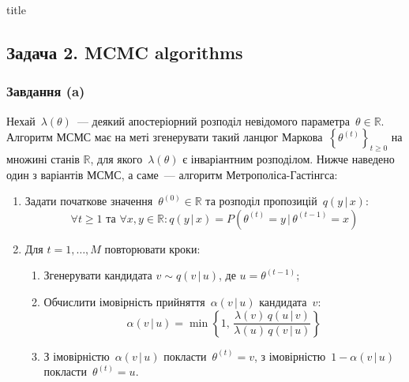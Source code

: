 \documentclass{mathreport}
\begin{document}
\ReportPreamble{}
\ReportSubject{}




{title}

\tableofcontents

\newpage

\subsection*{Задача 2. MCMC algorithms}
\setcounter{subsection}{2}
\setcounter{equation}{0}

\subsubsection*{Завдання (a)}

Нехай~$\lambda(\theta)$~--- деякий апостеріорний розподіл невідомого параметра~$\theta \in \mathbb{R}$. Алгоритм МСМС має на меті згенерувати такий ланцюг Маркова~$\left\{ \theta^{(t)} \right\}_{t \geqslant 0}$ на множині станів $\mathbb{R}$, для якого~$\lambda(\theta)$ є інваріантним розподілом. Нижче наведено один з варіантів МСМС, а саме~--- алгоритм Метрополіса-Гастінгса:
\begin{enumerate}
    \item Задати початкове значення~$\theta^{(0)} \in \mathbb{R}$ та розподіл пропозицій~$q(y\, |\, x):$
    \begin{equation}
        \forall t \geqslant 1 \text{ та } \forall x,y \in \mathbb{R}: q(y\, |\, x) = P\left( \theta^{(t)} = y\, |\, \theta^{(t-1)} = x \right)
    \end{equation}    
    \item Для $t=1,\ldots,M$ повторювати кроки:
    \begin{enumerate}
        \item Згенерувати кандидата $v \sim q(v\, |\, u)$, де $u = \theta^{(t-1)}$;
        \item Обчислити імовірність прийняття~$\alpha(v\, |\, u)$ кандидата~$v:$
        \begin{equation} 
            \alpha(v\, |\, u) = \min\left\{ 
                1,\, \frac{\lambda(v)\,q(u\, |\, v)}{\lambda(u)\,q(v\, |\, u)} 
            \right\}
        \end{equation}
        \item З імовірністю~$\alpha(v\, |\, u)$ покласти~$\theta^{(t)} = v$, з імовірністю~$1-\alpha(v\, |\, u)$ покласти~$\theta^{(t)} = u$.
    \end{enumerate}
\end{enumerate}
\end{document}
